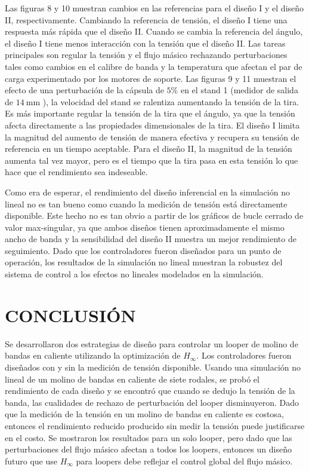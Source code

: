Las figuras 8 y 10 muestran cambios en las referencias para el diseño I y el diseño II, respectivamente. Cambiando la referencia de tensión, el diseño I tiene una respuesta más rápida que el diseño II. Cuando se cambia la referencia del ángulo, el diseño I tiene menos interacción con la tensión que el diseño II. Las tareas principales son regular la tensión y el flujo másico rechazando perturbaciones tales como cambios en el calibre de banda y la temperatura que afectan el par de carga experimentado por los motores de soporte. Las figuras 9 y 11 muestran el efecto de una perturbación de la cápsula de $5 \%$ en el stand 1 (medidor de salida de $14 \mathrm{~mm}$ ), la velocidad del stand se ralentiza aumentando la tensión de la tira. Es más importante regular la tensión de la tira que el ángulo, ya que la tensión afecta directamente a las propiedades dimensionales de la tira. El diseño I limita la magnitud del aumento de tensión de manera efectiva y recupera su tensión de referencia en un tiempo aceptable. Para el diseño II, la magnitud de la tensión aumenta tal vez mayor, pero es el tiempo que la tira pasa en esta tensión lo que hace que el rendimiento sea indeseable.

Como era de esperar, el rendimiento del diseño inferencial en la simulación no lineal no es tan bueno como cuando la medición de tensión está directamente disponible. Este hecho no es tan obvio a partir de los gráficos de bucle cerrado de valor max-singular, ya que ambos diseños tienen aproximadamente el mismo ancho de banda y la sensibilidad del diseño II muestra un mejor rendimiento de seguimiento. Dado que los controladores fueron diseñados para un punto de operación, los resultados de la simulación no lineal muestran la robustez del sistema de control a los efectos no lineales modelados en la simulación.

\section{CONCLUSIÓN}
Se desarrollaron dos estrategias de diseño para controlar un looper de molino de bandas en caliente utilizando la optimización de $H_{\infty}$. Los controladores fueron diseñados con y sin la medición de tensión disponible. Usando una simulación no lineal de un molino de bandas en caliente de siete rodales, se probó el rendimiento de cada diseño y se encontró que cuando se dedujo la tensión de la banda, las cualidades de rechazo de perturbación del looper disminuyeron. Dado que la medición de la tensión en un molino de bandas en caliente es costosa, entonces el rendimiento reducido producido sin medir la tensión puede justificarse en el costo. Se mostraron los resultados para un solo looper, pero dado que las perturbaciones del flujo másico afectan a todos los loopers, entonces un diseño futuro que use $H_{\infty}$ para loopers debe reflejar el control global del flujo másico.

